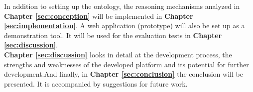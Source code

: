 In addition to setting up the ontology, the reasoning mechanisms analyzed in \textbf{Chapter \ref{sec:conception}} will be implemented in \textbf{Chapter \ref{sec:implementation}}. A web application (prototype) will also be set up as a demonstration tool. It will be used for the evaluation tests in \textbf{Chapter \ref{sec:discussion}}.\\

\textbf{Chapter \ref{sec:discussion}} looks in detail at the development process, the strengths and weaknesses of the developed platform and its potential for further development.And finally, in \textbf{Chapter \ref{sec:conclusion}} the conclusion will be presented. It is accompanied by suggestions for future work.

